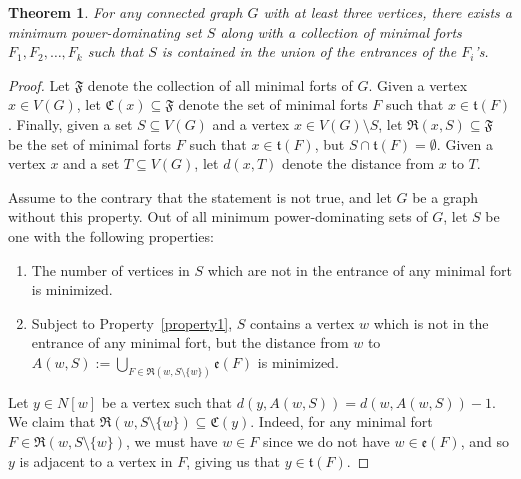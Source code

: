 \documentclass{article}
\newtheorem{theorem}{Theorem}[section]
\begin{document}
        \begin{theorem}
            For any connected graph $G$ with at least three vertices, there exists a minimum power-dominating set $S$ along with a collection of minimal forts $F_1,F_2,\dots, F_k$ such that $S$ is contained in the union of the entrances of the $F_i$'s.
        \end{theorem}
        \begin{proof}
            Let $\mathfrak{F}$ denote the collection of all minimal forts of $G$.
            Given a vertex $x\in V(G)$, let $\mathfrak{C}(x)\subseteq\mathfrak{F}$ denote the set of minimal forts $F$ such that $x\in \mathfrak{t}(F)$.
            Finally, given a set $S\subseteq V(G)$ and a vertex $x\in V(G)\setminus S$, let $\mathfrak{R}(x,S)\subseteq \mathfrak{F}$ be the set of minimal forts $F$ such that $x\in\mathfrak{t}(F)$, but $S\cap\mathfrak{t}(F)=\emptyset$.
            Given a vertex $x$ and a set $T\subseteq V(G)$, let $d(x,T)$ denote the distance from $x$ to $T$.
        
            Assume to the contrary that the statement is not true, and let $G$ be a graph without this property.
            Out of all minimum power-dominating sets of $G$, let $S$ be one with the following properties:
            \begin{enumerate}
                \item\label{property1}
                    The number of vertices in $S$ which are not in the entrance of any minimal fort is minimized.
                \item\label{property2}
                    Subject to Property~\ref{property1}, $S$ contains a vertex $w$ which is not in the entrance of any minimal fort, but the distance from $w$ to $\displaystyle A(w,S):=\bigcup_{F\in \mathfrak{R}(w,S\setminus \{w\})}\mathfrak{e}(F)$ is minimized. 
            \end{enumerate}
        
            Let $y\in N[w]$ be a vertex such that $d(y,A(w,S))=d(w,A(w,S))-1$.
            We claim that $\mathfrak{R}(w,S\setminus \{w\})\subseteq \mathfrak{C}(y)$.
            Indeed, for any minimal fort $F\in \mathfrak{R}(w,S\setminus \{w\})$, we must have $w\in F$ since we do not have $w\in \mathfrak{e}(F)$, and so $y$ is adjacent to a vertex in $F$, giving us that $y\in \mathfrak{t}(F)$.
        

\end{proof}
\end{document}
